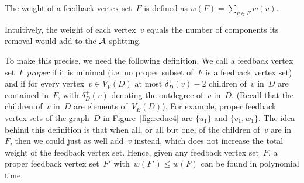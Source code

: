 The weight of a feedback vertex set~$F$ is defined as $w(F)= \sum_{v \in F} w(v)$.

Intuitively, the weight of each vertex~$v$ equals the number of components its removal would add to the ${\mathcal A}$-splitting.

To make this precise, we need the following definition. We call a feedback vertex set~$F$ \emph{proper} if it is minimal (i.e. no proper subset of~$F$ is a feedback vertex set) and if for every vertex~$v\in V_V(D)$ at most $\delta^+_D(v)-2$ children of~$v$ in~$D$ are contained in~$F$, with $\delta^+_D(v)$ denoting the outdegree of~$v$ in~$D$. (Recall that the children of~$v$ in~$D$ are elements of~$V_E(D)$). For example, proper feedback vertex sets of the graph~$D$ in Figure~\ref{fig:reduc4} are $\{u_1\}$ and $\{v_1,w_1\}$. The idea behind this definition is that when all, or all but one, of the children of~$v$ are in~$F$, then we could just as well add~$v$ instead, which does not increase the total weight of the feedback vertex set. Hence, given any feedback vertex set~$F$, a proper feedback vertex set~$F'$ with~$w(F')\leq w(F)$ can be found in polynomial time.


